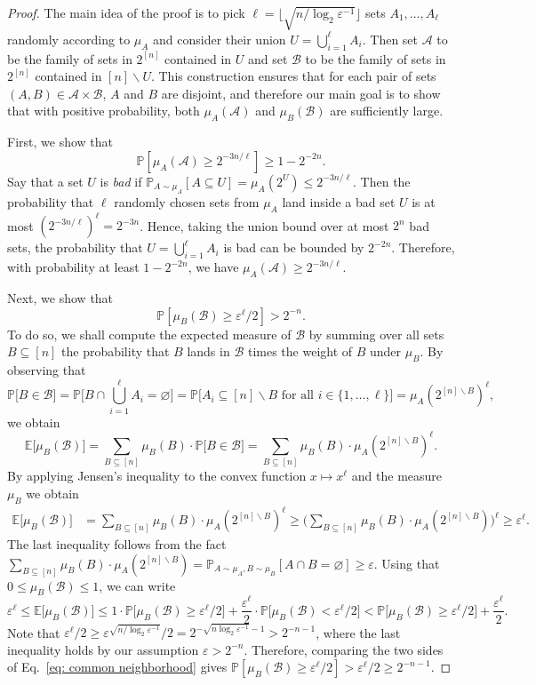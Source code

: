 \documentclass[10pt,a4paper]{amsart}
\def\Pb{\mathbb{P}}
\def\bE{\mathbb{E}}
\def\cA{\mathcal{A}}
\def\cB{\mathcal{B}}
\def\eps{\varepsilon}
\begin{document}
\begin{proof}
The main idea of the proof is to pick $\ell=\lfloor \sqrt{n/\log_2\eps^{-1}}\rfloor$ sets $A_1, \dots, A_\ell$ randomly according to $\mu_A$ and consider their union $U=\bigcup_{i=1}^\ell A_i$. Then set $\cA$ to be the family of sets in $2^{[n]}$ contained in $U$ and set $\cB$ to be the family of sets in $2^{[n]}$ contained in $[n]\backslash U$. This construction ensures that for each pair of sets $(A,B)\in \cA\times \cB$, $A$ and $B$ are disjoint, and therefore our main goal is to show that with positive probability, both $\mu_A(\cA)$ and $\mu_B(\cB)$ are sufficiently large.

First, we show that \[\Pb[\mu_A(\cA)\geq 2^{-3n/\ell}]\geq 1-2^{-2n}.\] Say that a set $U$ is \textit{bad} if $\Pb_{A\sim \mu_A}[A\subseteq U]=\mu_A(2^U)\leq 2^{-3n/\ell}$. Then the probability that $\ell$ randomly chosen sets from $\mu_A$ land inside a bad set $U$ is at most $(2^{-3n/\ell})^\ell=2^{-3n}$. Hence, taking the union bound over at most $2^n$ bad sets, the probability that $U=\bigcup_{i=1}^\ell A_i$ is bad can be bounded by $2^{-2n}$. Therefore, with probability at least $1-2^{-2n}$, we have $\mu_A(\cA)\geq 2^{-3n/\ell}$.

Next, we show that \[\Pb[\mu_B(\cB)\geq \eps^\ell/2]> 2^{-n}.\]
To do so, we shall compute the expected measure of $\cB$ by summing over all sets $B\subseteq [n]$ the probability that $B$ lands in $\cB$ times the weight of $B$ under $\mu_B$. By observing that \[\Pb\big[B\in \cB\big]=\Pb\big[B\cap \bigcup_{i=1}^\ell A_i=\varnothing\big]=\Pb\big[A_i\subseteq [n]\backslash B\text{ for all }i\in \{1, \dots, \ell\}\big]=\mu_A(2^{[n]\backslash B})^\ell,\] we obtain
\[\bE\big[\mu_B(\cB)\big]=\sum_{B\subseteq [n]} \mu_B(B)\cdot \Pb\big[B\in \cB\big]=\sum_{B\subseteq [n]} \mu_B(B)\cdot \mu_A(2^{[n]\backslash B})^\ell.\]
By applying Jensen's inequality to the convex function $x\mapsto x^\ell$ and the measure $\mu_B$ we obtain
\begin{align*}
\bE\big[\mu_B(\cB)\big]&=\sum_{B\subseteq [n]} \mu_B(B)\cdot \mu_A(2^{[n]\backslash B})^\ell\geq \Big(\sum_{B\subseteq [n]} \mu_B(B)\cdot \mu_A(2^{[n]\backslash B})\Big)^\ell\geq \eps^\ell.
\end{align*}
The last inequality follows from the fact $\sum_{B\subseteq [n]} \mu_B(B)\cdot \mu_A(2^{[n]\backslash B})=\Pb_{A\sim \mu_A, B\sim \mu_B}[A\cap B=\varnothing]\geq \eps$. Using that $0\leq \mu_B(\cB)\leq 1$, we can write \begin{equation}\label{eq: common neighborhood}\eps^\ell \leq \bE\big[\mu_B(\cB)\big]\leq  1\cdot \Pb\Big[\mu_B(\cB)\geq \eps^\ell /2\Big] + \frac{\eps^\ell }{2}\cdot \Pb\Big[\mu_B(\cB)< \eps^\ell/2\Big] <  \Pb\Big[\mu_B(\cB)\geq \eps^\ell /2\Big]+\frac{\eps^\ell }{2}.\end{equation}
Note that $\eps^\ell/2\geq \eps^{\sqrt{n/\log_2\eps^{-1}}}/2 = 2^{-\sqrt{n\log_2\eps^{-1}}-1}> 2^{-n-1}$, where the last inequality holds by our assumption $\eps> 2^{-n}$. Therefore, comparing the two sides of Eq.~\ref{eq: common neighborhood} gives $\Pb[\mu_B(\cB)\geq \eps^\ell/2]>\eps^{\ell}/2\geq 2^{-n-1}$. 


\end{proof}
\end{document}
